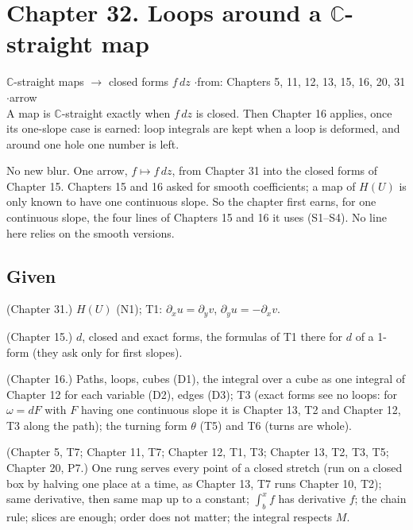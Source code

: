 \section*{Chapter 32. Loops around a $\mathbb{C}$-straight map}
\begin{center}
{\normalsize $\mathbb{C}$-straight maps $\to$ closed forms $f\,dz$ \quad$\cdot$\quad from: Chapters 5, 11, 12, 13, 15, 16, 20, 31 \quad$\cdot$\quad arrow}\\[4pt]
{\small A map is $\mathbb{C}$-straight exactly when $f\,dz$ is closed. Then Chapter 16 applies, once its one-slope case is earned: loop integrals are kept when a loop is deformed, and around one hole one number is left.}
\end{center}

No new blur. One arrow, $f \mapsto f\,dz$, from Chapter 31 into the closed forms of Chapter 15. Chapters 15 and 16 asked for smooth coefficients; a map of $H(U)$ is only known to have one continuous slope. So the chapter first earns, for one continuous slope, the four lines of Chapters 15 and 16 it uses (S1--S4). No line here relies on the smooth versions.

\subsection*{Given}

\begin{lines}
\item[\lab{G1}] (Chapter 31.) $H(U)$ (N1); T1: $\partial_x u = \partial_y v$, $\partial_y u = -\partial_x v$.
\item[\lab{G2}] (Chapter 15.) $d$, closed and exact forms, the formulas of T1 there for $d$ of a 1-form (they ask only for first slopes).
\item[\lab{G3}] (Chapter 16.) Paths, loops, cubes (D1), the integral over a cube as one integral of Chapter 12 for each variable (D2), edges (D3); T3 (exact forms see no loops: for $\omega = dF$ with $F$ having one continuous slope it is Chapter 13, T2 and Chapter 12, T3 along the path); the turning form $\theta$ (T5) and T6 (turns are whole).
\item[\lab{G4}] (Chapter 5, T7; Chapter 11, T7; Chapter 12, T1, T3; Chapter 13, T2, T3, T5; Chapter 20, P7.) One rung serves every point of a closed stretch (run on a closed box by halving one place at a time, as Chapter 13, T7 runs Chapter 10, T2); same derivative, then same map up to a constant; $\int_b^x f$ has derivative $f$; the chain rule; slices are enough; order does not matter; the integral respects $M$.
\end{lines}


